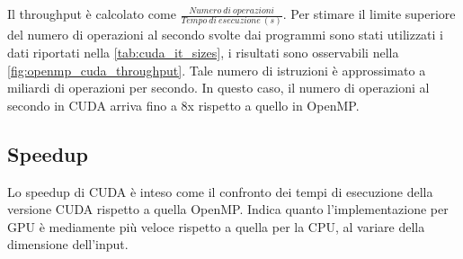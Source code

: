 \documentclass[12pt,a4paper]{report}
\begin{document}
\begin{figure}[H]
\end{figure}

Il throughput è calcolato come \(\frac{Numero\ di\ operazioni}{Tempo\ di\ esecuzione\ (s)}\).
Per stimare il limite superiore del numero di operazioni al secondo svolte dai programmi sono stati utilizzati i dati riportati
nella \autoref{tab:cuda_it_sizes}, i risultati sono osservabili nella \autoref{fig:openmp_cuda_throughput}.
Tale numero di istruzioni è approssimato a miliardi di operazioni per secondo.
In questo caso, il numero di operazioni al secondo in CUDA arriva fino a 8x rispetto a quello in OpenMP.

\subsection{Speedup}

Lo speedup di CUDA è inteso come il confronto dei tempi di esecuzione della versione CUDA rispetto a quella OpenMP.
Indica quanto l'implementazione per GPU è mediamente più veloce rispetto a quella per la CPU, al variare della dimensione
dell'input.
\end{document}
